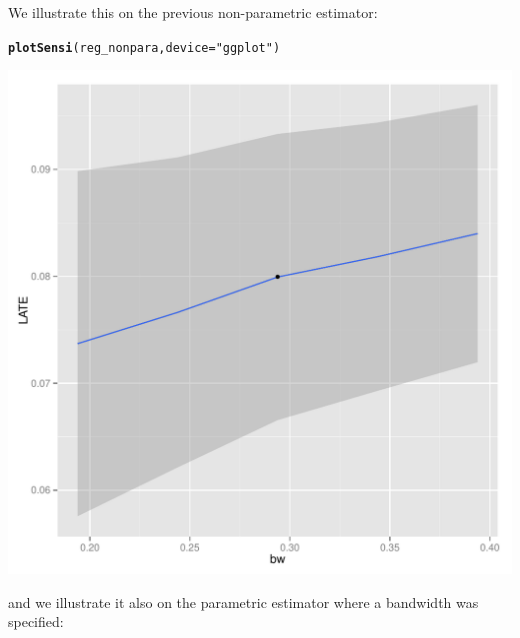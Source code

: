 \documentclass[english,nojss]{jss}\usepackage{graphicx, color}
\makeatletter
\def\maxwidth{ %
  \ifdim\Gin@nat@width>\linewidth
    \linewidth
  \else
    \Gin@nat@width
  \fi
}
\newcommand{\hlfunctioncall}[1]{\textcolor[rgb]{0.501960784313725,0,0.329411764705882}{\textbf{#1}}}%
\newcommand{\hlstring}[1]{\textcolor[rgb]{0.6,0.6,1}{#1}}%
\newenvironment{kframe}{%
 \def\at@end@of@kframe{}%
 \ifinner\ifhmode%
  \def\at@end@of@kframe{\end{minipage}}%
  \begin{minipage}{\columnwidth}%
 \fi\fi%
 \def\FrameCommand##1{\hskip\@totalleftmargin \hskip-\fboxsep
 \colorbox{shadecolor}{##1}\hskip-\fboxsep
     \hskip-\linewidth \hskip-\@totalleftmargin \hskip\columnwidth}%
 \MakeFramed {\advance\hsize-\width
   \@totalleftmargin\z@ \linewidth\hsize
   \@setminipage}}%
 {\par\unskip\endMakeFramed%
 \at@end@of@kframe}
\newenvironment{knitrout}{}{} %
\makeatother
\begin{document}
We illustrate this on the previous non-parametric estimator:

\begin{knitrout}
\color{fgcolor}\begin{kframe}
\begin{alltt}
\hlfunctioncall{plotSensi}(reg_nonpara, device = \hlstring{"ggplot"})
\end{alltt}
\end{kframe}
\includegraphics[width=\maxwidth]{figure/unnamed-chunk-13} 

\end{knitrout}


and we illustrate it also on the parametric estimator where a bandwidth
was specified:
\end{document}
